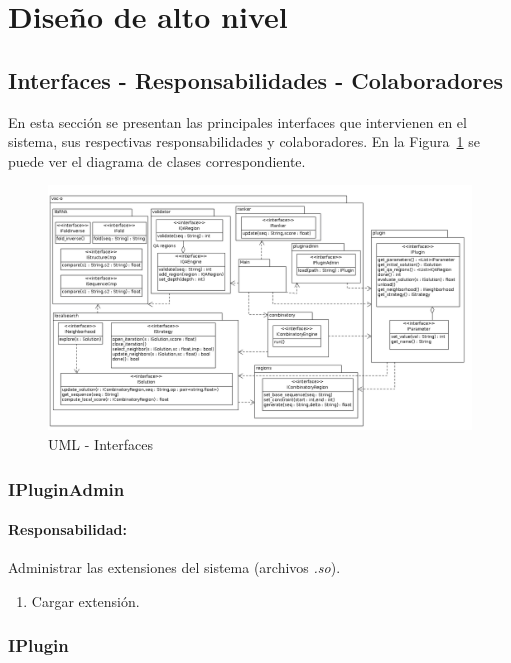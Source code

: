 \section{Dise\~no de alto nivel}
\label{hld}
\subsection{Interfaces - Responsabilidades - Colaboradores}
En esta secci\'on se presentan las principales interfaces que intervienen en el
sistema, sus respectivas responsabilidades y colaboradores. En la
Figura~\ref{uml:hld} se puede ver el diagrama de clases correspondiente.
\begin{figure}  
  \centering
  \includegraphics[scale=0.5, angle=90]{hld.png}  
  \caption{UML - Interfaces}
  \label{uml:hld}
\end{figure} 

  \subsubsection{IPluginAdmin}
    \paragraph{Responsabilidad:} Administrar las extensiones del sistema
(archivos \textit{.so}).    
      \begin{enumerate}
       \item Cargar extensi\'on.       
      \end{enumerate}    

  \subsubsection{IPlugin}
